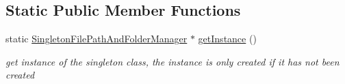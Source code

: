 \subsection*{Static Public Member Functions}
\begin{DoxyCompactItemize}
\item 
\hypertarget{class_singleton_file_path_and_folder_manager_abc622181f66ffdc08d17f728854b0e2b}{}\label{class_singleton_file_path_and_folder_manager_abc622181f66ffdc08d17f728854b0e2b} 
static \hyperlink{class_singleton_file_path_and_folder_manager}{Singleton\+File\+Path\+And\+Folder\+Manager} $\ast$ \hyperlink{class_singleton_file_path_and_folder_manager_abc622181f66ffdc08d17f728854b0e2b}{get\+Instance} ()
\begin{DoxyCompactList}\small\item\em get instance of the singleton class, the instance is only created if it has not been created \end{DoxyCompactList}\end{DoxyCompactItemize}
